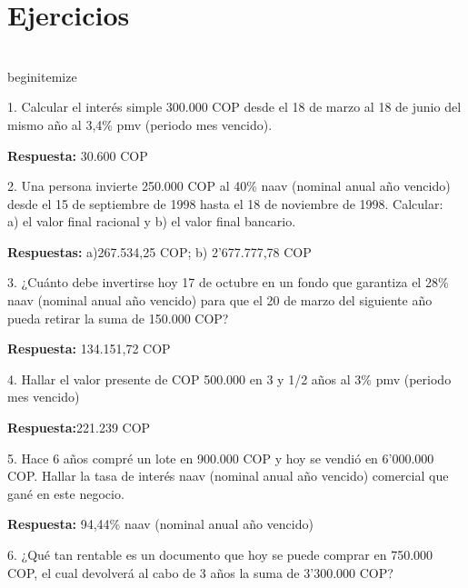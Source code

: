 

\chapter {Ejercicios}

\\begin{itemize}
 \item 1. Calcular el interés simple 300.000 COP desde el 18 de marzo al 18 de junio del mismo año al 3,4\% pmv (periodo mes vencido).
 
       \textbf{Respuesta:} 30.600 COP
       \medskip

 \item 2. Una persona invierte 250.000 COP al 40\% naav (nominal anual año vencido) desde el 15 de septiembre de 1998 hasta el 18 de noviembre de 1998. Calcular:\\
 
       a) el valor final racional y
       b) el valor final bancario.
       
       \textbf{Respuestas:} a)267.534,25 COP; b) 2’677.777,78 COP 
       \medskip

 \item 3. ¿Cuánto debe invertirse hoy 17 de octubre en un fondo que garantiza el 28\% naav (nominal anual año vencido) para que el 20 de marzo del siguiente año pueda retirar la suma de 150.000 COP?
 
       \textbf{Respuesta:} 134.151,72 COP 
       \medskip


 \item 4. Hallar el valor presente de COP 500.000 en 3 y 1/2 años al 3\% pmv (periodo mes vencido)
 
       \textbf{Respuesta:}221.239 COP 
       \medskip

 \item 5. Hace 6 años compré un lote en 900.000 COP y hoy se vendió en 6’000.000 COP. Hallar la tasa de interés naav (nominal anual año vencido)  comercial que gané en este negocio.
 
       \textbf{Respuesta: }94,44\% naav (nominal anual año vencido)
       \medskip

 \item 6. ¿Qué tan rentable es un documento que hoy se puede comprar en  750.000 COP, el cual devolverá al cabo de 3 años la suma de 3’300.000 COP?
 
